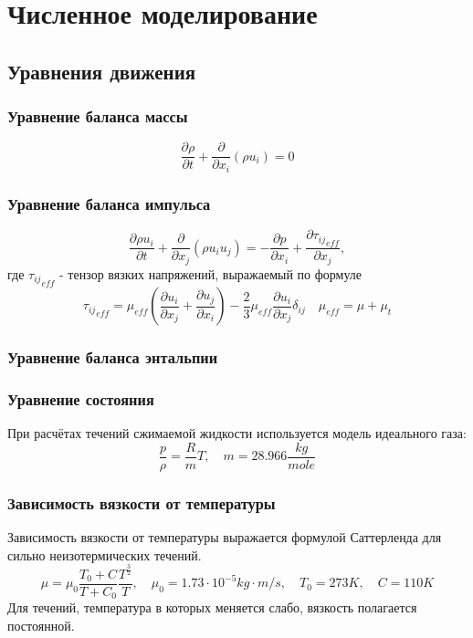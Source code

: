 \section{Численное моделирование}
	\subsection{Уравнения движения}
		\subsubsection{Уравнение баланса массы}
			\begin{equation}
				\frac{\partial \rho}{\partial t} + \frac{\partial}{\partial x_i}(\rho u_i) = 0
			\end{equation}
		\subsubsection{Уравнение баланса импульса}
			\begin{equation}
				\frac{\partial \rho u_i}{\partial t} + \frac{\partial}{\partial x_j}(\rho u_iu_j) = - \frac{\partial p}{\partial x_i} + \frac{\partial {\tau_{ij}}_{eff}}{\partial x_j},
			\end{equation}
			где ${\tau_{ij}}_{eff}$ - тензор вязких напряжений, выражаемый по формуле
			\begin{equation}
				{\tau_{ij}}_{eff} = \mu_{eff}\left( \frac{\partial u_i}{\partial x_j} + \frac{\partial u_j}{\partial x_i} \right) - \frac{2}{3}\mu_{eff}\frac{\partial u_i}{\partial x_j} \delta_{ij} \quad \mu_{eff} = \mu + \mu_{t}
			\end{equation}
		\subsubsection{Уравнение баланса энтальпии}
		\subsubsection{Уравнение состояния}
			\hspace{2em}При расчётах течений сжимаемой жидкости используется модель идеального газа:
			\begin{equation}
				\frac{p}{\rho} = \frac{R}{m}T, \quad m = 28.966 \frac{kg}{mole}
			\end{equation}
			\subsubsection{Зависимость вязкости от температуры}
				\hspace{2em}Зависимость вязкости от температуры выражается формулой Саттерленда для сильно неизотермических течений.
				\begin{equation}
					\mu = \mu_0 \frac{T_0 + C}{T + C_0} \frac{T^{\frac{3}{2}}}{T}, \quad \mu_0 = 1.73 \cdot 10^{-5} kg \cdot m/s, \quad T_0 = 273K, \quad C=110 K
				\end{equation}
				Для течений, температура в которых меняется слабо, вязкость полагается постоянной.
	\newpage
